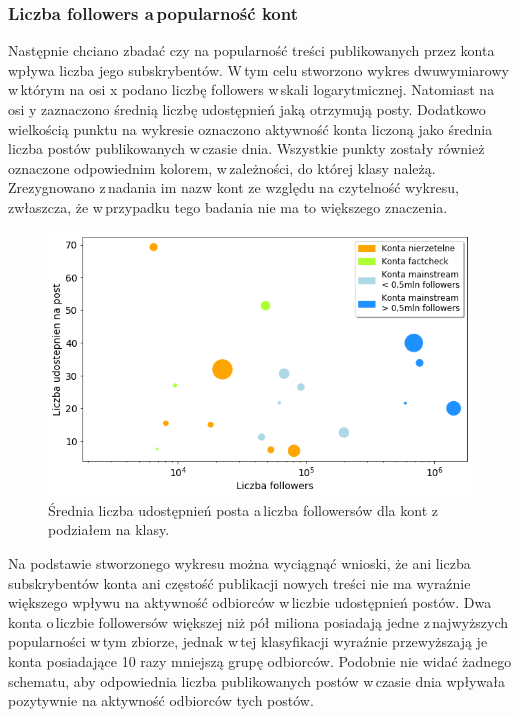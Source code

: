 \subsubsection{Liczba followers a\,popularność kont}
Następnie chciano zbadać czy na popularność treści publikowanych przez konta wpływa liczba jego subskrybentów. W\,tym celu stworzono wykres dwuwymiarowy w\,którym na osi x podano liczbę followers w\,skali logarytmicznej. Natomiast na osi y zaznaczono średnią liczbę udostępnień jaką otrzymują posty. Dodatkowo wielkością punktu na wykresie oznaczono aktywność konta liczoną jako średnia liczba postów publikowanych w\,czasie dnia. Wszystkie punkty zostały również oznaczone odpowiednim kolorem, w\,zależności, do której klasy należą. Zrezygnowano z\,nadania im nazw kont ze względu na czytelność wykresu, zwłaszcza, że w\,przypadku tego badania nie ma to większego znaczenia. 
\begin{figure}[!h]
	\centering \includegraphics[width=0.95\linewidth]{img/results/retweetsvsfollowers.png}
	\caption{Średnia liczba udostępnień posta a\,liczba followersów dla kont z\,podziałem na klasy.} \label{fig:retweets-vs-followers}
\end{figure}
\par

Na podstawie stworzonego wykresu można wyciągnąć wnioski, że ani liczba subskrybentów konta ani częstość publikacji nowych treści nie ma wyraźnie większego wpływu na aktywność odbiorców w\,liczbie udostępnień postów. Dwa konta o\,liczbie followersów większej niż pół miliona posiadają jedne z\,najwyższych popularności w\,tym zbiorze, jednak w\,tej klasyfikacji wyraźnie przewyższają je konta posiadające 10 razy mniejszą grupę odbiorców.  Podobnie nie widać żadnego schematu, aby odpowiednia liczba publikowanych postów w\,czasie dnia wpływała pozytywnie na aktywność odbiorców tych postów. 

